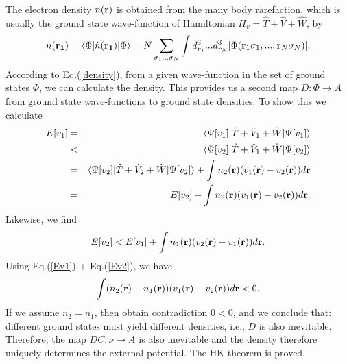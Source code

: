 The electron density $n({\bf r})$ is obtained from the many body rarefaction, which is usually the ground state wave-function of Hamiltonian $H_v={\hat T}+\hat V+ \hat W$, by
\begin{equation}
 n({\bf r_1})=\langle\Phi |\hat n({\bf r_1})|\Phi\rangle = N\sum_{\sigma_1...\sigma_N}\int d^3_{r_1}...d^3_{r_N}|\Phi({\bf r}_1\sigma_1,...,{\bf r}_N\sigma_N)|.
\label{density}
\end{equation}
According to Eq.\thinspace(\ref{density}), from a given wave-function in the set of ground states $\Phi$,  we can calculate the density.
This provides us a second map $D:\Phi \rightarrow A$ from ground state wave-functions to ground state densities. To show this we calculate 
\begin{eqnarray}
E[v_1] &=& \langle\Psi[v_1]|\hat T + \hat V_1 +\hat W|\Psi[v_1]\rangle \nonumber\\  
           &<& \langle\Psi[v_2]|\hat T + \hat V_1 +\hat W|\Psi[v_2]\rangle \nonumber \\
           &=&  \langle\Psi[v_2]|\hat T + \hat V_2 +\hat W|\Psi[v_2]\rangle +\int n_2({\bf r})(v_1({\bf r})-v_2({\bf r}))d{\bf r} \nonumber\\
           &=&  E[v_2] +\int n_2({\bf r})(v_1({\bf r})-v_2({\bf r}))d{\bf r} \label{Ev1}.
\end{eqnarray}
Likewise, we find
\begin{equation}
E[v_2]<  E[v_1] +\int n_1({\bf r})(v_2({\bf r})-v_1({\bf r}))d{\bf r} \label{Ev2}.
\end{equation}
 Using Eq.\thinspace(\ref{Ev1}) + Eq.\thinspace(\ref{Ev2}), we have
 \begin{equation}
  \int (n_2({\bf r})-n_1({\bf r}))(v_1({\bf r})-v_2({\bf r}))d{\bf r} < 0.
 \end{equation}
If we assume $n_2=n_1$, then obtain contradiction $0<0$, and we conclude that: different ground states must yield
different densities, i.e., $D$ is also inevitable. Therefore, the map $DC: \nu \rightarrow A$ is also inevitable and the density therefore uniquely determines the external potential. The HK theorem is proved.


